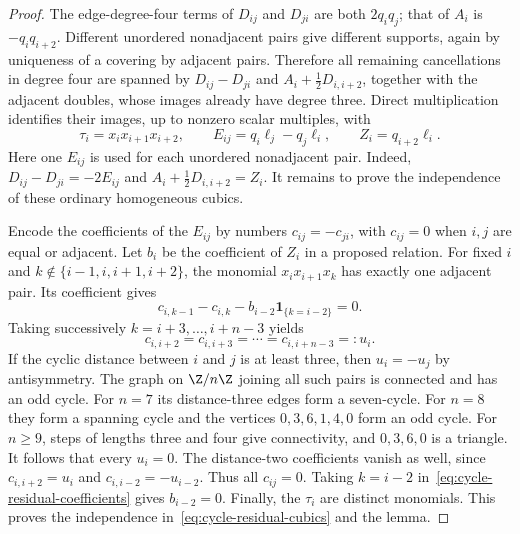\begin{proof}
The edge-degree-four terms of $D_{ij}$ and $D_{ji}$ are both $2q_iq_j$;
that of $A_i$ is $-q_iq_{i+2}$. Different unordered nonadjacent pairs
give different supports, again by uniqueness of a covering by adjacent
pairs. Therefore all remaining cancellations in degree four are
spanned by $D_{ij}-D_{ji}$ and
$A_i+\tfrac12D_{i,i+2}$, together with the adjacent doubles, whose
images already have degree three. Direct multiplication identifies
their images, up to nonzero scalar multiples, with
\begin{equation}\label{eq:cycle-residual-cubics}
 \tau_i=x_ix_{i+1}x_{i+2},\qquad
 E_{ij}=q_i\ell_j-q_j\ell_i,\qquad
 Z_i=q_{i+2}\ell_i.
\end{equation}
Here one $E_{ij}$ is used for each unordered nonadjacent pair. Indeed,
$D_{ij}-D_{ji}=-2E_{ij}$ and
$A_i+\tfrac12D_{i,i+2}=Z_i$. It remains to prove the independence of
these ordinary homogeneous cubics.

Encode the coefficients of the $E_{ij}$ by numbers $c_{ij}=-c_{ji}$,
with $c_{ij}=0$ when $i,j$ are equal or adjacent. Let $b_i$ be the
coefficient of $Z_i$ in a proposed relation. For fixed $i$ and
$k\notin\{i-1,i,i+1,i+2\}$, the monomial $x_ix_{i+1}x_k$ has exactly
one adjacent pair. Its coefficient gives
\begin{equation}\label{eq:cycle-residual-coefficients}
 c_{i,k-1}-c_{i,k}-b_{i-2}\mathbf1_{\{k=i-2\}}=0.
\end{equation}
Taking successively $k=i+3,\ldots,i+n-3$ yields
\[
 c_{i,i+2}=c_{i,i+3}=\cdots=c_{i,i+n-3}=:u_i.
\]
If the cyclic distance between $i$ and $j$ is at least three, then
$u_i=-u_j$ by antisymmetry. The graph on $\Z/n\Z$ joining all such
pairs is connected and has an odd cycle. For $n=7$ its distance-three
edges form a seven-cycle. For $n=8$ they form a spanning cycle and the
vertices $0,3,6,1,4,0$ form an odd cycle. For $n\ge9$, steps of lengths
three and four give connectivity, and $0,3,6,0$ is a triangle. It follows
that every $u_i=0$. The distance-two coefficients vanish as well, since
$c_{i,i+2}=u_i$ and $c_{i,i-2}=-u_{i-2}$. Thus all $c_{ij}=0$.
Taking $k=i-2$ in~\eqref{eq:cycle-residual-coefficients} gives
$b_{i-2}=0$. Finally, the $\tau_i$ are distinct monomials. This proves
the independence in~\eqref{eq:cycle-residual-cubics} and the lemma.
\end{proof}


